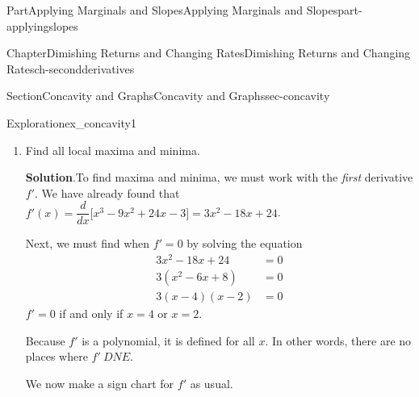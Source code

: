 \documentclass[oneside,10pt,]{tufte-book}
\newcommand{\blocktitlefont}{\relax}
\numberwithin{equation}{chapter}
\newcommand{\ddx}[1]{ \dfrac{d}{dx} \Big[ #1 \Big]  }
\newcommand{\amp}{&}
\begin{document}
\begin{partptx}{Part}{Applying Marginals and Slopes}{}{Applying Marginals and Slopes}{}{}{part-applyingslopes}
\begin{chapterptx}{Chapter}{Dimishing Returns and Changing Rates}{}{Dimishing Returns and Changing Rates}{}{}{ch-secondderivatives}
\begin{sectionptx}{Section}{Concavity and Graphs}{}{Concavity and Graphs}{}{}{sec-concavity}
\begin{exploration}{Exploration}{}{ex_concavity1}
\begin{enumerate}[font=\bfseries,label=(\alph*),ref=\alph*]
\begin{image}{0.25}{0.5}{0.25}{}
{
}%
\end{image}%
 Using our graph, we see that the function is concave up on the interval \((3,\infty)\), it is concave down on the interval \((-\infty,3)\), and has a point of inflection at \(x=3\).%
\item{}Find all local maxima and minima.%
\par\smallskip%
\noindent\textbf{\blocktitlefont Solution}.\hypertarget{ex_concavity1-3-2}{}\quad{}To find maxima and minima, we must work with the \emph{first} derivative \(f'\). We have already found that \(f'(x) = \ddx{x^3 - 9x^2 + 24x - 3 } = 3x^2 -18x +24 \).%
\par
Next, we must find when \(f'=0\) by solving the equation%
\begin{align*}
3x^2 - 18x + 24 \amp = 0\\
3(x^2 - 6x +  8) \amp =0\\
3(x - 4)(x - 2) \amp =0
\end{align*}
\(f'=0\) if and only if \(x=4\) or \(x=2\).%
\par
Because \(f'\) is a polynomial, it is defined for all \(x\).  In other words, there are no places where \(f'\ DNE\).%
\par
We now make a sign chart for \(f'\) as usual. \begin{image}{0.25}{0.5}{0.25}{}%
\end{image}
\end{enumerate}
\end{exploration}
\end{sectionptx}
\end{chapterptx}
\end{partptx}
\end{document}

